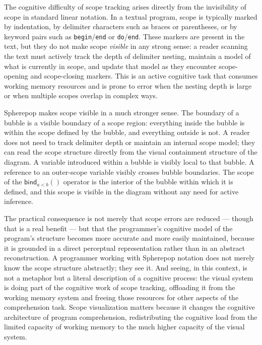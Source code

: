 \documentclass[12pt,openany]{book}
\theoremstyle{plain}
\theoremstyle{definition}
\theoremstyle{remark}
\newcommand{\sbind}[2]{\mathsf{bind}_{#1}\!\left(#2\right)}
\begin{document}
The cognitive difficulty of scope tracking arises directly from the invisibility of scope in standard linear notation. In a textual program, scope is typically marked by indentation, by delimiter characters such as braces or parentheses, or by keyword pairs such as \texttt{begin}/\texttt{end} or \texttt{do}/\texttt{end}. These markers are present in the text, but they do not make scope \emph{visible} in any strong sense: a reader scanning the text must actively track the depth of delimiter nesting, maintain a model of what is currently in scope, and update that model as they encounter scope-opening and scope-closing markers. This is an active cognitive task that consumes working memory resources and is prone to error when the nesting depth is large or when multiple scopes overlap in complex ways.

Spherepop makes scope visible in a much stronger sense. The boundary of a bubble is a visible boundary of a scope region: everything inside the bubble is within the scope defined by the bubble, and everything outside is not. A reader does not need to track delimiter depth or maintain an internal scope model; they can read the scope structure directly from the visual containment structure of the diagram. A variable introduced within a bubble is visibly local to that bubble. A reference to an outer-scope variable visibly crosses bubble boundaries. The scope of the $\sbind{a<b}{}$ operator is the interior of the bubble within which it is defined, and this scope is visible in the diagram without any need for active inference.

The practical consequence is not merely that scope errors are reduced — though that is a real benefit — but that the programmer's cognitive model of the program's structure becomes more accurate and more easily maintained, because it is grounded in a direct perceptual representation rather than in an abstract reconstruction. A programmer working with Spherepop notation does not merely know the scope structure abstractly; they see it. And seeing, in this context, is not a metaphor but a literal description of a cognitive process: the visual system is doing part of the cognitive work of scope tracking, offloading it from the working memory system and freeing those resources for other aspects of the comprehension task. Scope visualization matters because it changes the cognitive architecture of program comprehension, redistributing the cognitive load from the limited capacity of working memory to the much higher capacity of the visual system.
\end{document}
